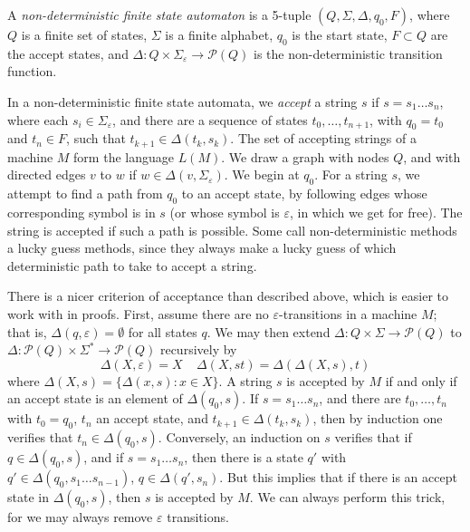 A \emph{non-deterministic finite state automaton} is a 5-tuple $(Q, \Sigma, \Delta, q_0, F)$, where $Q$ is a finite set of states, $\Sigma$ is a finite alphabet, $q_0$ is the start state, $F \subset Q$ are the accept states, and $\Delta: Q \times \Sigma_\varepsilon \to \mathcal{P}(Q)$ is the non-deterministic transition function.

In a non-deterministic finite state automata, we \emph{accept} a string $s$ if $s = s_1 \dots s_n$, where each $s_i \in \Sigma_\varepsilon$, and there are a sequence of states $t_0, \dots, t_{n+1}$, with $q_0 = t_0$ and $t_n \in F$, such that $t_{k+1} \in \Delta(t_k, s_k)$. The set of accepting strings of a machine $M$ form the language $L(M)$. We draw a graph with nodes $Q$, and with directed edges $v$ to $w$ if $w \in \Delta(v, \Sigma_{\varepsilon})$. We begin at $q_0$. For a string $s$, we attempt to find a path from $q_0$ to an accept state, by following edges whose corresponding symbol is in $s$ (or whose symbol is $\varepsilon$, in which we get for free). The string is accepted if such a path is possible. Some call non-deterministic methods a lucky guess methods, since they always make a lucky guess of which deterministic path to take to accept a string.

There is a nicer criterion of acceptance than described above, which is easier to work with in proofs. First, assume there are no $\varepsilon$-transitions in a machine $M$; that is, $\Delta(q, \varepsilon) = \emptyset$ for all states $q$. We may then extend $\Delta: Q \times \Sigma \to \mathcal{P}(Q)$ to $\Delta: \mathcal{P}(Q) \times \Sigma^* \to \mathcal{P}(Q)$ recursively by
%
\[ \Delta(X, \varepsilon) = X \ \ \ \ \ \Delta(X, st) = \Delta(\Delta(X,s), t) \]
%
where $\Delta(X,s) = \{ \Delta(x,s) : x \in X \}$. A string $s$ is accepted by $M$ if and only if an accept state is an element of $\Delta(q_0, s)$. If $s = s_1 \dots s_n$, and there are $t_0, \dots, t_n$ with $t_0 = q_0$, $t_n$ an accept state, and $t_{k+1} \in \Delta(t_k, s_k)$, then by induction one verifies that $t_n \in \Delta(q_0, s)$. Conversely, an induction on $s$ verifies that if $q \in \Delta(q_0, s)$, and if $s = s_1 \dots s_n$, then there is a state $q'$ with $q' \in \Delta(q_0, s_1 \dots s_{n-1})$, $q \in \Delta(q', s_n)$. But this implies that if there is an accept state in $\Delta(q_0, s)$, then $s$ is accepted by $M$. We can always perform this trick, for we may always remove $\varepsilon$ transitions.

